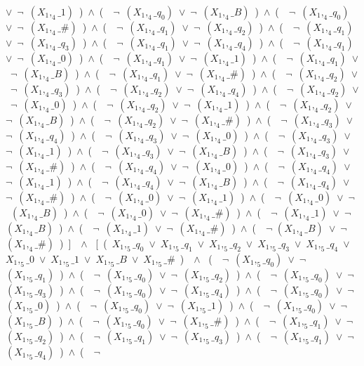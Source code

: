 ﻿\documentclass[a4paper,10pt]{article}
\begin{document}
$\vee$\ $\neg$\ $(X_1,_4\_1)$\ )\ $\wedge$\ (\ \ $\neg$\ $(X_1,_4\_q_0)$\ $\vee$\ $\neg$\ $(X_1,_4\_B)$\ )\ $\wedge$\ (\ \ $\neg$\ $(X_1,_4\_q_0)$\ $\vee$\ $\neg$\ $(X_1,_4\_\#)$\ )\ $\wedge$\ (\ \ $\neg$\ $(X_1,_4\_q_1)$\ $\vee$\ $\neg$\ $(X_1,_4\_q_2)$\ )\ $\wedge$\ (\ \ $\neg$\ $(X_1,_4\_q_1)$\ $\vee$\ $\neg$\ $(X_1,_4\_q_3)$\ )\ $\wedge$\ (\ \ $\neg$\ $(X_1,_4\_q_1)$\ $\vee$\ $\neg$\ $(X_1,_4\_q_4)$\ )\ $\wedge$\ (\ \ $\neg$\ $(X_1,_4\_q_1)$\ $\vee$\ $\neg$\ $(X_1,_4\_0)$\ )\ $\wedge$\ (\ \ $\neg$\ $(X_1,_4\_q_1)$\ $\vee$\ $\neg$\ $(X_1,_4\_1)$\ )\ $\wedge$\ (\ \ $\neg$\ $(X_1,_4\_q_1)$\ $\vee$\ $\neg$\ $(X_1,_4\_B)$\ )\ $\wedge$\ (\ \ $\neg$\ $(X_1,_4\_q_1)$\ $\vee$\ $\neg$\ $(X_1,_4\_\#)$\ )\ $\wedge$\ (\ \ $\neg$\ $(X_1,_4\_q_2)$\ $\vee$\ $\neg$\ $(X_1,_4\_q_3)$\ )\ $\wedge$\ (\ \ $\neg$\ $(X_1,_4\_q_2)$\ $\vee$\ $\neg$\ $(X_1,_4\_q_4)$\ )\ $\wedge$\ (\ \ $\neg$\ $(X_1,_4\_q_2)$\ $\vee$\ $\neg$\ $(X_1,_4\_0)$\ )\ $\wedge$\ (\ \ $\neg$\ $(X_1,_4\_q_2)$\ $\vee$\ $\neg$\ $(X_1,_4\_1)$\ )\ $\wedge$\ (\ \ $\neg$\ $(X_1,_4\_q_2)$\ $\vee$\ $\neg$\ $(X_1,_4\_B)$\ )\ $\wedge$\ (\ \ $\neg$\ $(X_1,_4\_q_2)$\ $\vee$\ $\neg$\ $(X_1,_4\_\#)$\ )\ $\wedge$\ (\ \ $\neg$\ $(X_1,_4\_q_3)$\ $\vee$\ $\neg$\ $(X_1,_4\_q_4)$\ )\ $\wedge$\ (\ \ $\neg$\ $(X_1,_4\_q_3)$\ $\vee$\ $\neg$\ $(X_1,_4\_0)$\ )\ $\wedge$\ (\ \ $\neg$\ $(X_1,_4\_q_3)$\ $\vee$\ $\neg$\ $(X_1,_4\_1)$\ )\ $\wedge$\ (\ \ $\neg$\ $(X_1,_4\_q_3)$\ $\vee$\ $\neg$\ $(X_1,_4\_B)$\ )\ $\wedge$\ (\ \ $\neg$\ $(X_1,_4\_q_3)$\ $\vee$\ $\neg$\ $(X_1,_4\_\#)$\ )\ $\wedge$\ (\ \ $\neg$\ $(X_1,_4\_q_4)$\ $\vee$\ $\neg$\ $(X_1,_4\_0)$\ )\ $\wedge$\ (\ \ $\neg$\ $(X_1,_4\_q_4)$\ $\vee$\ $\neg$\ $(X_1,_4\_1)$\ )\ $\wedge$\ (\ \ $\neg$\ $(X_1,_4\_q_4)$\ $\vee$\ $\neg$\ $(X_1,_4\_B)$\ )\ $\wedge$\ (\ \ $\neg$\ $(X_1,_4\_q_4)$\ $\vee$\ $\neg$\ $(X_1,_4\_\#)$\ )\ $\wedge$\ (\ \ $\neg$\ $(X_1,_4\_0)$\ $\vee$\ $\neg$\ $(X_1,_4\_1)$\ )\ $\wedge$\ (\ \ $\neg$\ $(X_1,_4\_0)$\ $\vee$\ $\neg$\ $(X_1,_4\_B)$\ )\ $\wedge$\ (\ \ $\neg$\ $(X_1,_4\_0)$\ $\vee$\ $\neg$\ $(X_1,_4\_\#)$\ )\ $\wedge$\ (\ \ $\neg$\ $(X_1,_4\_1)$\ $\vee$\ $\neg$\ $(X_1,_4\_B)$\ )\ $\wedge$\ (\ \ $\neg$\ $(X_1,_4\_1)$\ $\vee$\ $\neg$\ $(X_1,_4\_\#)$\ )\ $\wedge$\ (\ \ $\neg$ $(X_1,_4\_B)$\ $\vee$\ $\neg$ $(X_1,_4\_\#)$\ )\ ]\ \ $\wedge$ \ [\ (\ $X_1,_5\_q_0$\ $\vee$\ $X_1,_5\_q_1$\ $\vee$\ $X_1,_5\_q_2$\ $\vee$\ $X_1,_5\_q_3$\ $\vee$\ $X_1,_5\_q_4$\ $\vee$\ $X_1,_5\_0$\ $\vee$\ $X_1,_5\_1$\ $\vee$\ $X_1,_5\_B$\ $\vee$\ $X_1,_5\_\#$\ )\ \ $\wedge$ \ (\ \ $\neg$\ $(X_1,_5\_q_0)$\ $\vee$\ $\neg$\ $(X_1,_5\_q_1)$\ )\ $\wedge$\ (\ \ $\neg$\ $(X_1,_5\_q_0)$\ $\vee$\ $\neg$\ $(X_1,_5\_q_2)$\ )\ $\wedge$\ (\ \ $\neg$\ $(X_1,_5\_q_0)$\ $\vee$\ $\neg$\ $(X_1,_5\_q_3)$\ )\ $\wedge$\ (\ \ $\neg$\ $(X_1,_5\_q_0)$\ $\vee$\ $\neg$\ $(X_1,_5\_q_4)$\ )\ $\wedge$\ (\ \ $\neg$\ $(X_1,_5\_q_0)$\ $\vee$\ $\neg$\ $(X_1,_5\_0)$\ )\ $\wedge$\ (\ \ $\neg$\ $(X_1,_5\_q_0)$\ $\vee$\ $\neg$\ $(X_1,_5\_1)$\ )\ $\wedge$\ (\ \ $\neg$\ $(X_1,_5\_q_0)$\ $\vee$\ $\neg$\ $(X_1,_5\_B)$\ )\ $\wedge$\ (\ \ $\neg$\ $(X_1,_5\_q_0)$\ $\vee$\ $\neg$\ $(X_1,_5\_\#)$\ )\ $\wedge$\ (\ \ $\neg$\ $(X_1,_5\_q_1)$\ $\vee$\ $\neg$\ $(X_1,_5\_q_2)$\ )\ $\wedge$\ (\ \ $\neg$\ $(X_1,_5\_q_1)$\ $\vee$\ $\neg$\ $(X_1,_5\_q_3)$\ )\ $\wedge$\ (\ \ $\neg$\ $(X_1,_5\_q_1)$\ $\vee$\ $\neg$\ $(X_1,_5\_q_4)$\ )\ $\wedge$\ (\ \ $\neg$\ 
\end{document}
